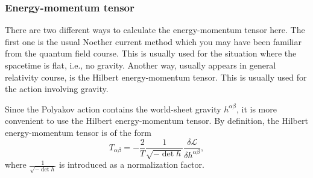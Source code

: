 \documentclass[graybox,envcountchap,sectrefs]{svmono}
\begin{document}
\subsubsection*{Energy-momentum tensor}

There are two different ways to calculate the energy-momentum tensor here. The first one is the usual Noether current method which you may have been familiar from the quantum field course. 
This is usually used for the situation where the spacetime is flat, i.e., no gravity.
Another way, usually appears in general relativity course, is the Hilbert energy-momentum tensor. This is usually used for the action involving gravity.


Since the Polyakov action contains the world-sheet gravity $h^{\alpha\beta}$, it is more convenient to use the Hilbert energy-momentum tensor.
By definition, the Hilbert energy-momentum tensor is of the form
\begin{equation}
\boxed{
	T_{\alpha\beta}=-\frac{2}{T}\frac{1}{\sqrt{-\det h}}\frac{\delta \mathcal{L}}{\delta h^{\alpha\beta}},}
\end{equation}
where $\frac{1}{\sqrt{-\det h}}$ is introduced as a normalization factor. 
\end{document}
